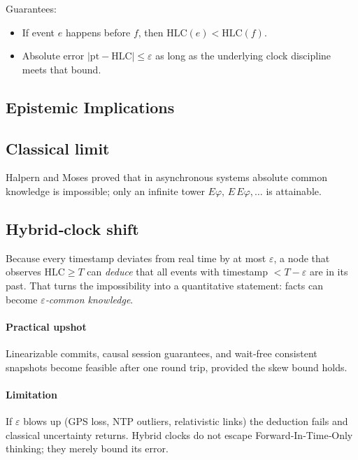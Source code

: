 Guarantees:

\begin{itemize}
\item If event $e$ happens before $f$, then $\text{HLC}(e)<\text{HLC}(f)$.
\item Absolute error $|\text{pt}-\text{HLC}| \le \varepsilon$ as long as
      the underlying clock discipline meets that bound.
\end{itemize}

\subsection{Epistemic Implications}

\subsection*{Classical limit}
Halpern and Moses proved that in asynchronous systems absolute common
knowledge is impossible; only an infinite tower
$E\varphi,\,E\,E\varphi,\ldots$ is attainable.

\subsection*{Hybrid‐clock shift}
Because every timestamp deviates from real time by at most
$\varepsilon$, a node that observes $\text{HLC}\ge T$ can
\emph{deduce} that all events with timestamp $<T-\varepsilon$ are in its
past.  That turns the impossibility into a quantitative statement:
facts can become \emph{$\varepsilon$‐common knowledge}.


\paragraph{Practical upshot}
Linearizable commits, causal session guarantees, and wait‐free
consistent snapshots become feasible after one round trip, provided the
skew bound holds.

\paragraph{Limitation}
If $\varepsilon$ blows up (GPS loss, NTP outliers, relativistic links)
the deduction fails and classical uncertainty returns. Hybrid clocks do
not escape Forward‑In‑Time‑Only thinking; they merely bound its error.


